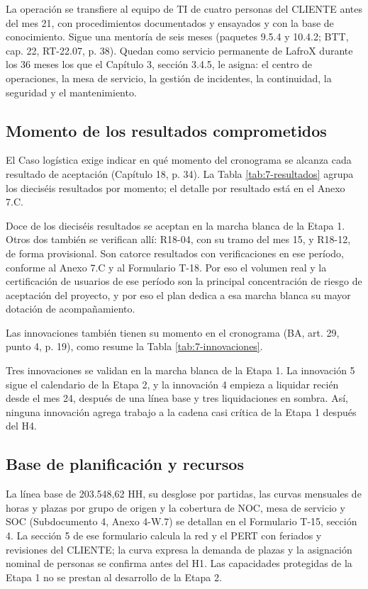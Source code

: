 La operación se transfiere al equipo de TI de cuatro personas del CLIENTE antes del mes 21, con procedimientos documentados y ensayados y con la base de conocimiento. Sigue una mentoría de seis meses (paquetes 9.5.4 y 10.4.2; BTT, cap. 22, RT-22.07, p. 38). Quedan como servicio permanente de LafroX durante los 36 meses los que el Capítulo 3, sección 3.4.5, le asigna: el centro de operaciones, la mesa de servicio, la gestión de incidentes, la continuidad, la seguridad y el mantenimiento.

\subsection{Momento de los resultados comprometidos}

El Caso logística exige indicar en qué momento del cronograma se alcanza cada resultado de aceptación (Capítulo 18, p. 34). La Tabla \ref{tab:7-resultados} agrupa los dieciséis resultados por momento; el detalle por resultado está en el Anexo 7.C.


Doce de los dieciséis resultados se aceptan en la marcha blanca de la Etapa 1. Otros dos también se verifican allí: R18-04, con su tramo del mes 15, y R18-12, de forma provisional. Son catorce resultados con verificaciones en ese período, conforme al Anexo 7.C y al Formulario T-18. Por eso el volumen real y la certificación de usuarios de ese período son la principal concentración de riesgo de aceptación del proyecto, y por eso el plan dedica a esa marcha blanca su mayor dotación de acompañamiento.

Las innovaciones también tienen su momento en el cronograma (BA, art. 29, punto 4, p. 19), como resume la Tabla \ref{tab:7-innovaciones}.


Tres innovaciones se validan en la marcha blanca de la Etapa 1. La innovación 5 sigue el calendario de la Etapa 2, y la innovación 4 empieza a liquidar recién desde el mes 24, después de una línea base y tres liquidaciones en sombra. Así, ninguna innovación agrega trabajo a la cadena casi crítica de la Etapa 1 después del H4.

\subsection{Base de planificación y recursos}

La línea base de 203.548,62 HH, su desglose por partidas, las curvas mensuales de horas y plazas por grupo de origen y la cobertura de NOC, mesa de servicio y SOC (Subdocumento 4, Anexo 4-W.7) se detallan en el Formulario T-15, sección 4. La sección 5 de ese formulario calcula la red y el PERT con feriados y revisiones del CLIENTE; la curva expresa la demanda de plazas y la asignación nominal de personas se confirma antes del H1. Las capacidades protegidas de la Etapa 1 no se prestan al desarrollo de la Etapa 2.

